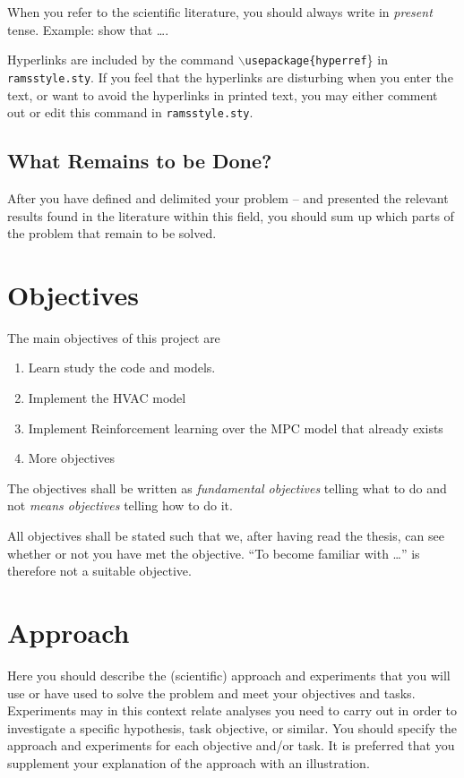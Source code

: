 When you refer to the scientific literature, you should always write in \emph{present} tense. Example: \citet{rausand04} show that \ldots.

\begin{remark}
Hyperlinks are included by the command \texttt{$\backslash$usepackage\{hyperref}\} in \texttt{ramsstyle.sty}. If you feel that the hyperlinks are disturbing when you enter the text, or want to avoid the hyperlinks in printed text, you may either comment out or edit this command in \texttt{ramsstyle.sty}.
\end{remark}
\subsection*{What Remains to be Done?}
After you have defined and delimited your problem -- and presented the relevant results found in the literature within this field, you should sum up which parts of the problem that remain to be solved.
\section{Objectives}
The main objectives of this project are
\begin{enumerate}
\item Learn study the code and models.
\item Implement the HVAC model
\item Implement Reinforcement learning over the MPC model that already exists
\item More objectives
\end{enumerate}

The objectives shall be written as \emph{fundamental objectives} telling what to do and not \emph{means objectives} telling how to do it.

All objectives shall be stated such that we, after having read the thesis, can see whether or not you have met the objective. ``To become familiar with \ldots'' is therefore not a suitable objective.

\section{Approach}
Here you should describe the (scientific) approach and experiments that you will use or have used to solve the problem and meet your objectives and tasks. Experiments may in this context relate analyses you need to carry out in order to investigate a specific hypothesis, task objective, or similar. You should specify the approach and experiments for each objective and/or task. It is preferred that you supplement your explanation of the approach with an illustration.

